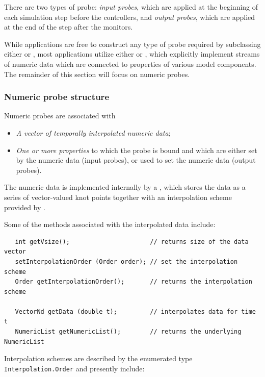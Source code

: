 There are two types of probe: {\it input probes}, which are applied at
the beginning of each simulation step before the controllers, and {\it
output probes}, which are applied at the end of the step after the
monitors.

While applications are free to construct any type of probe required by
subclassing either  or
, most applications
utilize either  or
, which
explicitly implement streams of numeric data which are connected to
properties of various model components.  The remainder of this section
will focus on numeric probes.

\subsubsection{Numeric probe structure}
\label{NumericProbeStructure:sec}

Numeric probes are associated with

\begin{itemize}

\item {\it A vector of temporally interpolated numeric data};

\item {\it One or more properties} to which the probe is bound and
which are either set by the numeric data (input probes), or used to
set the numeric data (output probes).

\end{itemize}

The numeric data is implemented internally by a
, which stores the data
as a series of vector-valued knot points together with an
interpolation scheme provided by
.  

Some of the methods associated with the interpolated data include:
%
\begin{lstlisting}
   int getVsize();                      // returns size of the data vector
   setInterpolationOrder (Order order); // set the interpolation scheme
   Order getInterpolationOrder();       // returns the interpolation scheme

   VectorNd getData (double t);         // interpolates data for time t
   NumericList getNumericList();        // returns the underlying NumericList
\end{lstlisting}
%
Interpolation schemes are described by the enumerated type {\tt
Interpolation.Order} and presently include:

